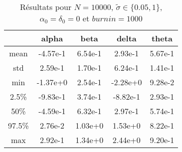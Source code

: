 \begin{table}[h!]
    \centering
    \begin{tabular}{|c|c|c|c|c|}
    \hline
           & alpha    & beta    & delta    & theta   \\ \hline
    mean   & -4.57e-1 & 6.54e-1 & 2.93e-1  & 5.67e-1 \\ \hline
    std    & 2.59e-1  & 1.70e-1 & 6.24e-1  & 1.41e-1 \\ \hline
    min    & -1.37e+0 & 2.54e-1 & -2.28e+0 & 9.28e-2 \\ \hline
    2.5\%  & -9.83e-1 & 3.74e-1 & -8.82e-1 & 2.93e-1 \\ \hline
    50\%   & -4.59e-1 & 6.32e-1 & 2.97e-1  & 5.74e-1 \\ \hline
    97.5\% & 2.76e-2  & 1.03e+0 & 1.53e+0  & 8.22e-1 \\ \hline
    max    & 2.92e-1  & 1.34e+0 & 2.44e+0  & 9.20e-1 \\ \hline
    \end{tabular}
    \caption{Résultats pour $N=10000$, $\tilde\sigma \in \{0.05, 1\}$, $\alpha_0=\delta_0=0$ et $burnin = 1000$}
    \label{tab:results}
\end{table}